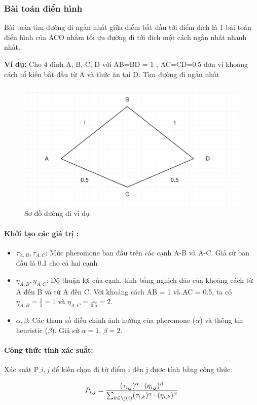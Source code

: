 \documentclass[14pt]{article}
\begin{document}
	\subsubsection{Bài toán điển hình}
	Bài toán tìm đường đi ngắn nhất giữa điểm bắt đầu tới điểm đích là 1 bài toán điển hình của ACO nhằm tối ưu đường đi tới đích một cách ngắn nhất nhanh nhất.
	
	\textbf{Ví dụ:} Cho 4 đình A, B, C, D với AB=BD = 1 , AC=CD=0.5 đơn vị khoảng cách tổ kiến bắt đầu từ A và thức ăn tại D. Tìm đường đi ngắn nhất
	\begin{figure}[htbp]
		\centering
		\includegraphics[width=\textwidth]{./Image/Sơ đồ đường đi ví dụ.png}
		\caption{Sơ đồ đường đi ví dụ}
		\label{fig:mylabel}
	\end{figure}
	\newpage
	\paragraph{Khởi tạo các giá trị :}
		\begin{itemize}
			\item $\tau_{A,B}, \tau_{A,C}$: Mức pheromone ban đầu trên các cạnh A-B và A-C. Giả sử ban đầu là 0.1 cho cả hai cạnh
			
			\item $\eta_{A,B}, \eta_{A,C}$: Độ thuận lợi của cạnh, tính bằng nghịch đảo của khoảng cách từ A đến B và từ A đến C. Với khoảng cách AB = 1 và AC = 0.5, ta có $\eta_{A,B} = \frac{1}{1} = 1$ và $\eta_{A,C} = \frac{1}{0.5} = 2$.
			
			
			\item $\alpha, \beta$: Các tham số điều chỉnh ảnh hưởng của pheromone ($\alpha$) và thông tin heuristic ($\beta$). Giả sử $\alpha=1$, $\beta=2$.
			
		\end{itemize}
	\paragraph{Công thức tính xác suất:}
	Xác suất P$\_{i,j}$ để kiến chọn đi từ điểm i đến j được tính bằng công thức: 
		\begin{center}
			\[
			P_{i,j} = \frac{(\tau_{i,j})^\alpha \cdot (\eta_{i,j})^\beta}{\sum_{k \in \j(i)} (\tau_{i,k})^\alpha \cdot (\eta_{i,k})^\beta}
			\]
		\end{center}
\end{document}
